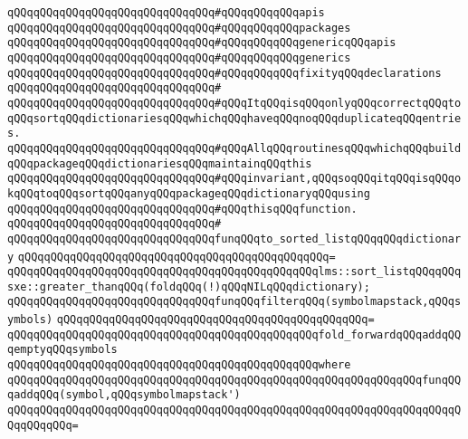 \verb|qQQqqQQqqQQqqQQqqQQqqQQqqQQqqQQq#qQQqqQQqqQQqapis|\newline
\verb|qQQqqQQqqQQqqQQqqQQqqQQqqQQqqQQq#qQQqqQQqqQQqpackages|\newline
\verb|qQQqqQQqqQQqqQQqqQQqqQQqqQQqqQQq#qQQqqQQqqQQqgenericqQQqapis|\newline
\verb|qQQqqQQqqQQqqQQqqQQqqQQqqQQqqQQq#qQQqqQQqqQQqgenerics|\newline
\verb|qQQqqQQqqQQqqQQqqQQqqQQqqQQqqQQq#qQQqqQQqqQQqfixityqQQqdeclarations|\newline
\verb|qQQqqQQqqQQqqQQqqQQqqQQqqQQqqQQq#|\newline
\verb|qQQqqQQqqQQqqQQqqQQqqQQqqQQqqQQq#qQQqItqQQqisqQQqonlyqQQqcorrectqQQqtoqQQqsortqQQqdictionariesqQQqwhichqQQqhaveqQQqnoqQQqduplicateqQQqentries.|\newline
\verb|qQQqqQQqqQQqqQQqqQQqqQQqqQQqqQQq#qQQqAllqQQqroutinesqQQqwhichqQQqbuildqQQqpackageqQQqdictionariesqQQqmaintainqQQqthis|\newline
\verb|qQQqqQQqqQQqqQQqqQQqqQQqqQQqqQQq#qQQqinvariant,qQQqsoqQQqitqQQqisqQQqokqQQqtoqQQqsortqQQqanyqQQqpackageqQQqdictionaryqQQqusing|\newline
\verb|qQQqqQQqqQQqqQQqqQQqqQQqqQQqqQQq#qQQqthisqQQqfunction.|\newline
\verb|qQQqqQQqqQQqqQQqqQQqqQQqqQQqqQQq#|\newline
\verb|qQQqqQQqqQQqqQQqqQQqqQQqqQQqqQQqfunqQQqto_sorted_listqQQqqQQqdictionary|\newline
\verb|qQQqqQQqqQQqqQQqqQQqqQQqqQQqqQQqqQQqqQQqqQQqqQQq=|\newline
\verb|qQQqqQQqqQQqqQQqqQQqqQQqqQQqqQQqqQQqqQQqqQQqqQQqlms::sort_listqQQqqQQqsxe::greater_thanqQQq(foldqQQq(!)qQQqNILqQQqdictionary);|\newline
\newline
\newline
\verb|qQQqqQQqqQQqqQQqqQQqqQQqqQQqqQQqfunqQQqfilterqQQq(symbolmapstack,qQQqsymbols)|\newline
\verb|qQQqqQQqqQQqqQQqqQQqqQQqqQQqqQQqqQQqqQQqqQQqqQQq=|\newline
\verb|qQQqqQQqqQQqqQQqqQQqqQQqqQQqqQQqqQQqqQQqqQQqqQQqfold_forwardqQQqaddqQQqemptyqQQqsymbols|\newline
\verb|qQQqqQQqqQQqqQQqqQQqqQQqqQQqqQQqqQQqqQQqqQQqqQQqwhere|\newline
\verb|qQQqqQQqqQQqqQQqqQQqqQQqqQQqqQQqqQQqqQQqqQQqqQQqqQQqqQQqqQQqqQQqfunqQQqaddqQQq(symbol,qQQqsymbolmapstack')|\newline
\verb|qQQqqQQqqQQqqQQqqQQqqQQqqQQqqQQqqQQqqQQqqQQqqQQqqQQqqQQqqQQqqQQqqQQqqQQqqQQqqQQq=|\newline
